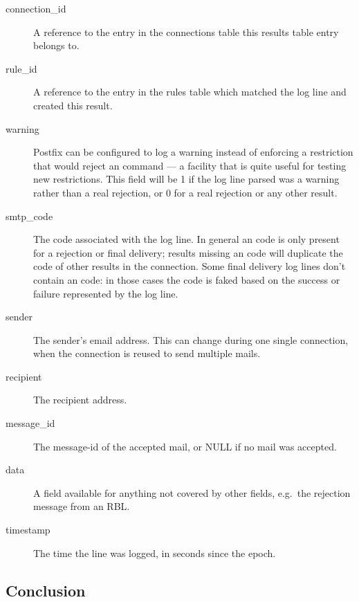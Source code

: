 \documentclass[a4paper,12pt,draft]{article}
\begin{document}
\begin{description}

    \item [connection\_id] A reference to the entry in the connections
        table this results table entry belongs to.

    \item [rule\_id] A reference to the entry in the rules table which
        matched the log line and created this result.

    \item [warning] Postfix can be configured to log a warning instead of
        enforcing a restriction that would reject an \SMTP{} command --- a
        facility that is quite useful for testing new restrictions.  This
        field will be 1 if the log line parsed was a warning rather than a
        real rejection, or 0 for a real rejection or any other result.

    \item [smtp\_code] The \SMTP{} code associated with the log line.  In
        general an \SMTP{} code is only present for a rejection or final
        delivery; results missing an \SMTP{} code will duplicate the
        \SMTP{} code of other results in the connection.  Some final
        delivery log lines don't contain an \SMTP{} code: in those cases
        the code is faked based on the success or failure represented by
        the log line.

    \item [sender] The sender's email address.  This can change during one
        single connection, when the connection is reused to send multiple
        mails.

    \item [recipient] The recipient address.

    \item [message\_id] The message-id of the accepted mail, or NULL if no
        mail was accepted.

    \item [data] A field available for anything not covered by other
        fields, e.g.\ the rejection message from an RBL\@.

    \item [timestamp] The time the line was logged, in seconds since the
        epoch.

\end{description}

\subsection{Conclusion}
\end{document}
